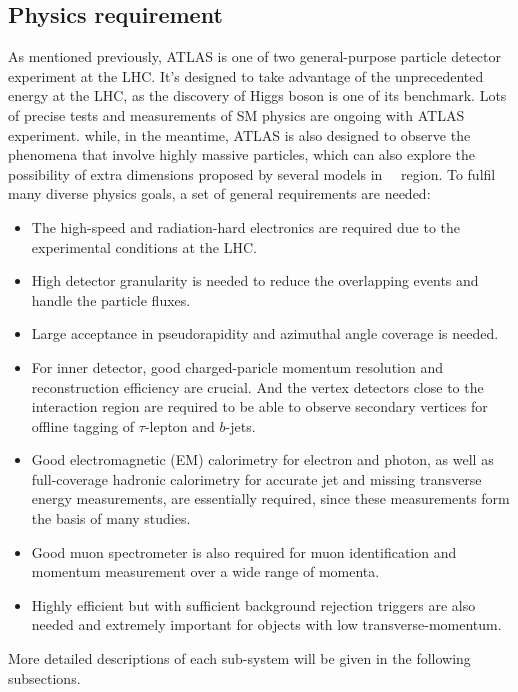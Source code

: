 \subsection{Physics requirement}

As mentioned previously, ATLAS is one of two general-purpose particle detector experiment at the LHC.
It's designed to take advantage of the unprecedented energy at the LHC, as the discovery of Higgs boson is one of its benchmark. 
Lots of precise tests and measurements of SM physics are ongoing with ATLAS experiment.
while, in the meantime, ATLAS is also designed to observe the phenomena that involve highly massive particles,
which can also explore the possibility of extra dimensions proposed by several models in~\tev~ region.
To fulfil many diverse physics goals, a set of general requirements are needed:
\begin{itemize}
	\item The high-speed and radiation-hard electronics are required due to the experimental conditions at the LHC. 
	\item High detector granularity is needed to reduce the overlapping events and handle the particle fluxes.
	\item Large acceptance in pseudorapidity and azimuthal angle coverage is needed.
	\item For inner detector, good charged-paricle momentum resolution and reconstruction efficiency are crucial. And the vertex detectors close to the interaction region are required to be able to observe secondary vertices for offline tagging of $\tau$-lepton and $b$-jets.
	\item Good electromagnetic (EM) calorimetry for electron and photon, as well as full-coverage hadronic calorimetry for accurate jet and missing transverse energy measurements, are essentially required, since these measurements form the basis of many studies.
	\item Good muon spectrometer is also required for muon identification and momentum measurement over a wide range of momenta.
	\item Highly efficient but with sufficient background rejection triggers are also needed and extremely important for objects with low transverse-momentum. 
\end{itemize}

More detailed descriptions of each sub-system will be given in the following subsections.
